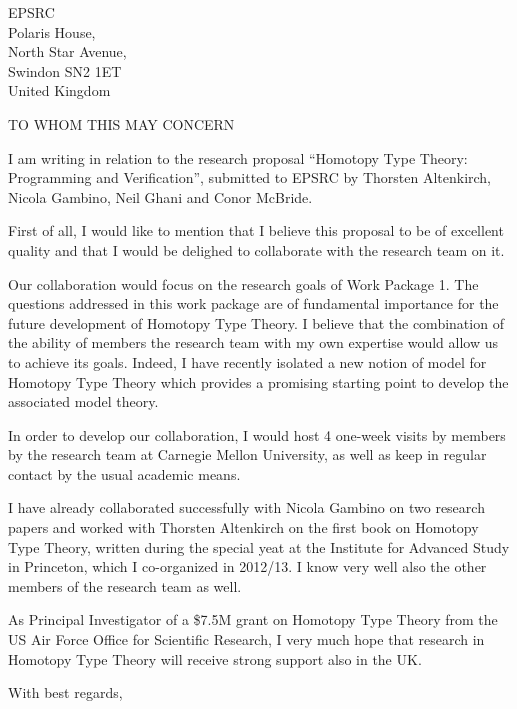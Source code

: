 \documentclass[10pt,a4paper,oneside]{letter}
\date{June 27th, 2014}
\begin{document}
\begin{letter}{
EPSRC \\
Polaris House, \\
North Star Avenue, \\
Swindon SN2 1ET\\
United Kingdom}

\opening{TO WHOM THIS MAY CONCERN}


I am writing in relation to the research proposal ``Homotopy Type Theory: Programming and Verification'', submitted to EPSRC by Thorsten Altenkirch, Nicola Gambino, Neil Ghani and Conor McBride.

First of all, I would like to mention that I believe this proposal to be of excellent quality and that I would be delighed to collaborate with the research team on it. 

Our collaboration would focus on the research goals of Work Package 1. The questions addressed in this work package are of fundamental importance for the future development of Homotopy Type Theory. I believe that the combination of the ability of members the research team with my own expertise would allow us to achieve its goals. Indeed, I have recently isolated a new notion of model for Homotopy Type Theory which provides a promising starting point to develop the associated model theory. 

In order to develop our collaboration, I would host 4 one-week visits by members by the research team at Carnegie Mellon University, as well as keep in regular contact by
the usual academic means.

I have already collaborated successfully with Nicola Gambino on two research papers and worked with Thorsten Altenkirch on the first book on Homotopy Type Theory, written during the special yeat at the Institute for Advanced Study in Princeton, which I co-organized in 2012/13. I know very well also the other members of the research team as well. 



As Principal Investigator of a \$7.5M grant on Homotopy Type Theory from the US Air Force Office for Scientific Research, I very much hope that research in Homotopy Type Theory will receive strong support also in the UK. 


\closing{With best regards,}

\end{letter}
\end{document}
